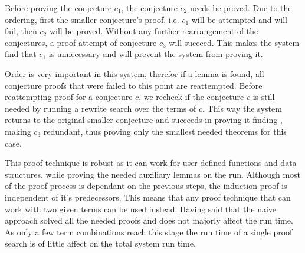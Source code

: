 Before proving the conjecture $c_1$, the conjecture $c_2$ needs be proved.
Due to the ordering, first the smaller conjecture's proof, i.e. $c_1$ will be attempted and will fail, then $c_2$ will be proved.
Without any further rearrangement of the conjectures, a proof attempt of conjecture $c_3$ will succeed. 
This makes the system find that $c_1$ is unnecessary and will prevent the system from proving it.
\begin{comment}
\ES{We've already been through such an explanation so seems redundant to put this here}
This happens because during the screening phase both
$\tfold ~ (+) ~ 0 ~ \pholder{1}{\tlist\,\tnat}$ and 
$0 + \big(\tfold ~ (+) ~ 0 ~ {\pholder{1}{\tlist\,\tnat}}\big)$ 
are in the same fine equivalence class.
\end{comment}

Order is very important in this system, therefor if a lemma is found, all conjecture proofs that were failed to this point are reattempted.
Before reattempting proof for a conjecture $c$, we recheck if the conjecture $c$ is still needed by running a rewrite search over the terms of $c$.
This way the system returns to the original smaller conjecture and succeeds in proving it finding , making 
$c_3$ redundant, thus proving only the smallest needed theorems for this case.

This proof technique is robust as it can work for user defined functions and data structures, while proving the needed auxiliary lemmas on the run. 
Although most of the proof process is dependant on the previous steps, the induction proof is independent of it's predecessors. 
This means that any proof technique that can work with two given terms can be used instead. 
Having said that the naive approach solved all the needed proofs and does not majorly affect the run time. 
As only a few term combinations reach this stage the run time of a single proof search is of little affect on the total system run time.

